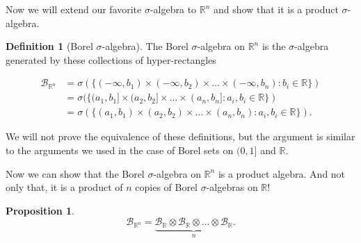 \documentclass{book}
\theoremstyle{plain}%
\newtheorem{proposition}{Proposition}[section]
\theoremstyle{definition}
\newtheorem{definition}{Definition}[section]
\begin{document}
Now we will extend our favorite $\sigma$-algebra to $\mathbb{R}^n$ and show that it is a product $\sigma$-algebra.

\begin{definition}[Borel $\sigma$-algebra]
The Borel $\sigma$-algebra on $\mathbb{R}^n$ is the $\sigma$-algebra generated by these collections of hyper-rectangles

\begin{align*}
\mathcal{B}_{\mathbb{R}^n} &= \sigma(\{(-\infty, b_1) \times (-\infty, b_2) \times \hdots \times (-\infty, b_n) : b_i \in \mathbb{R}\})\\
 &= \sigma(\{(a_1, b_1] \times (a_2, b_2] \times \hdots \times (a_n, b_n] : a_i, b_i \in \mathbb{R}\})\\
&= \sigma(\{(a_1, b_1) \times (a_2, b_2) \times \hdots \times (a_n, b_n) : a_i, b_i \in \mathbb{R}\}).
\end{align*}

\end{definition}

We will not prove the equivalence of these definitions, but the argument is similar to the arguments we used in the case of Borel sets on $(0,1]$ and $\mathbb{R}$.

Now we can show that the Borel $\sigma$-algebra on $\mathbb{R}^n$ is a product algebra. And not only that, it is a product of $n$ copies of Borel $\sigma$-algebras on $\mathbb{R}$!

\begin{proposition}
$$\mathcal{B}_{\mathbb{R}^n} = \underbrace{\mathcal{B}_\mathbb{R} \otimes \mathcal{B}_\mathbb{R} \otimes \hdots \otimes \mathcal{B}_\mathbb{R}}_n.$$
\end{proposition}
\end{document}
